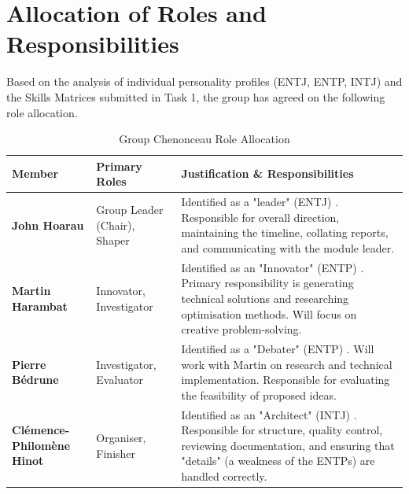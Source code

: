 \section{Allocation of Roles and Responsibilities}

Based on the analysis of individual personality profiles (ENTJ, ENTP, INTJ) and the Skills Matrices submitted in Task 1, the group has agreed on the following role allocation.

\begin{table}[H]
\centering
\caption{Group Chenonceau Role Allocation}
\label{tab:roles}
\small
\renewcommand{\arraystretch}{1.4}
\begin{tabular}{p{3cm} p{3.5cm} p{7.5cm}}
\toprule
\textbf{Member} & \textbf{Primary Roles} & \textbf{Justification \& Responsibilities} \\
\midrule
\textbf{John Hoarau} & Group Leader (Chair), Shaper & Identified as a "leader" (ENTJ) \cite{hoarauTask1}. Responsible for overall direction, maintaining the timeline, collating reports, and communicating with the module leader. \\
\midrule
\textbf{Martin Harambat} & Innovator, Investigator & Identified as an "Innovator" (ENTP) \cite{harambatTask1}. Primary responsibility is generating technical solutions and researching optimisation methods. Will focus on creative problem-solving. \\
\midrule
\textbf{Pierre Bédrune} & Investigator, Evaluator & Identified as a "Debater" (ENTP) \cite{bedruneTask1}. Will work with Martin on research and technical implementation. Responsible for evaluating the feasibility of proposed ideas. \\
\midrule
\textbf{Clémence-Philomène Hinot} & Organiser, Finisher & Identified as an "Architect" (INTJ) \cite{hinotTask1}. Responsible for structure, quality control, reviewing documentation, and ensuring that "details" (a weakness of the ENTPs) are handled correctly. \\
\bottomrule
\end{tabular}
\end{table}